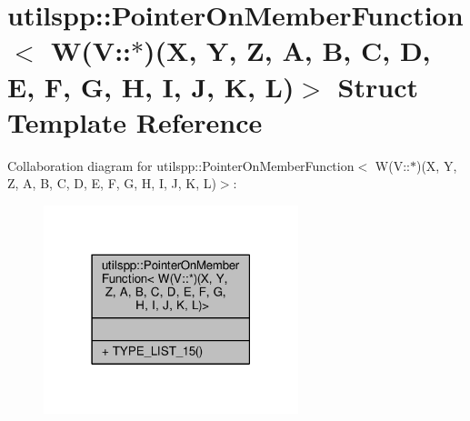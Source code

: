 \hypertarget{structutilspp_1_1PointerOnMemberFunction_3_01W_07V_1_1_5_08_07X_00_01Y_00_01Z_00_01A_00_01B_00_07161b1228eaaa251377e300b0722bf86}{\section{utilspp\-:\-:Pointer\-On\-Member\-Function$<$ W(V\-:\-:$\ast$)(X, Y, Z, A, B, C, D, E, F, G, H, I, J, K, L)$>$ Struct Template Reference}
\label{structutilspp_1_1PointerOnMemberFunction_3_01W_07V_1_1_5_08_07X_00_01Y_00_01Z_00_01A_00_01B_00_07161b1228eaaa251377e300b0722bf86}
}


Collaboration diagram for utilspp\-:\-:Pointer\-On\-Member\-Function$<$ W(V\-:\-:$\ast$)(X, Y, Z, A, B, C, D, E, F, G, H, I, J, K, L)$>$\-:\nopagebreak
\begin{figure}[H]
\begin{center}
\leavevmode
\includegraphics[width=210pt]{structutilspp_1_1PointerOnMemberFunction_3_01W_07V_1_1_5_08_07X_00_01Y_00_01Z_00_01A_00_01B_00_0bbfa148d3f68758503b9ab66d89bdff8}
\end{center}
\end{figure}
